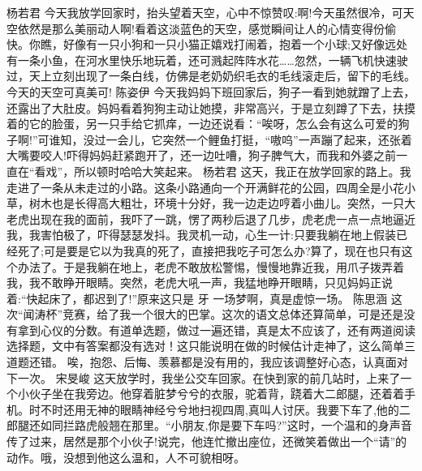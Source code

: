 {}\markdownRendererInterblockSeparator
{}杨若君\markdownRendererInterblockSeparator
{}今天我放学回家时，抬头望着天空，心中不惊赞叹:啊!今天虽然很冷，可天空依然是那么美丽动人啊!看着这淡蓝色的天空，感觉瞬间让人的心情变得份偷快。你瞧，好像有一只小狗和一只小猫正嬉戏打闹着，抱着一个小球;又好像远处有一条小鱼，在河水里快乐地玩着，还可溅起阵阵水花……忽然，一辆飞机快速驶过，天上立刻出现了一条白线，仿佛是老奶奶织毛衣的毛线滚走后，留下的毛线。\markdownRendererInterblockSeparator
{}今天的天空可真美可! \markdownRendererInterblockSeparator
{}\markdownRendererInterblockSeparator
{}陈姿伊\markdownRendererInterblockSeparator
{}今天我妈妈下班回家后，狗子一看到她就蹭了上去，还露出了大肚皮。妈妈看着狗狗主动让她摸，非常高兴，于是立刻蹲了下去，扶摸着的它的脸蛋，另一只手给它抓痒，一边还说看：“唉呀，怎么会有这么可爱的狗子啊!”可谁知，没过一会儿，它突然一个鲤鱼打挺，“嗷呜”一声蹦了起来，还张着大嘴要咬人!吓得妈妈赶紧跑开了，还一边吐嘈，狗子脾气大，而我和外婆之前一直在“看戏”，所以顿时哈哈大笑起来。 \markdownRendererInterblockSeparator
{}\markdownRendererInterblockSeparator
{}杨若君\markdownRendererInterblockSeparator
{}这天，我正在放学回家的路上。我走进了一条从未走过的小路。这条小路通向一个开满鲜花的公园，四周全是小花小草，树木也是长得高大粗壮，环境十分好，我一边走边哼着小曲儿。突然，一只大老虎出现在我的面前，我吓了一跳，愣了两秒后退了几步，虎老虎一点一点地逼近我，我害怕极了，吓得瑟瑟发抖。我灵机一动，心生一计:只要我躺在地上假装已经死了;可是要是它以为我真的死了，直接把我吃子可怎么办?算了，现在也只有这个办法了。于是我躺在地上，老虎不敢放松警惕，慢慢地靠近我，用爪子拨弄着我，我不敢睁开眼睛。突然，老虎大吼一声，我猛地睁开眼睛，只见妈妈正说着:“快起床了，都迟到了!”原来这只是 牙 一场梦啊，真是虚惊一场。 \markdownRendererInterblockSeparator
{}\markdownRendererInterblockSeparator
{}陈思涵\markdownRendererInterblockSeparator
{}这次“闻涛杯”竞赛，给了我一个很大的巴掌。这次的语文总体还算简单，可是还是没有拿到心仪的分数。有道单选题，做过一遍还错，真是太不应该了，还有两道阅读选择题，文中有答案都没有选对！这只能说明在做的时候估计走神了，这么简单三道题还错。 唉，抱怨、后悔、羡慕都是没有用的，我应该调整好心态，认真面对下一次。\markdownRendererInterblockSeparator
{}\markdownRendererInterblockSeparator
{}宋旻峻\markdownRendererInterblockSeparator
{}这天放学时，我坐公交车回家。在快到家的前几站时，上来了一个小伙子坐在我旁边。他穿着脏梦兮兮的衣服，驼着背，跷着大二郎腿，还着着手机。时不时还用无神的眼睛神经兮兮地扫视四周,真叫人讨厌。我要下车了,他的二郎腿还如同拦路虎般翘在那里。“小朋友,你是要下车吗?”这时，一个温和的身声音传了过来，居然是那个小伙子!说完，他连忙撤出座位，还微笑着做出一个“请”的动作。哦，没想到他这么温和，人不可貌相呀。\markdownRendererInterblockSeparator
